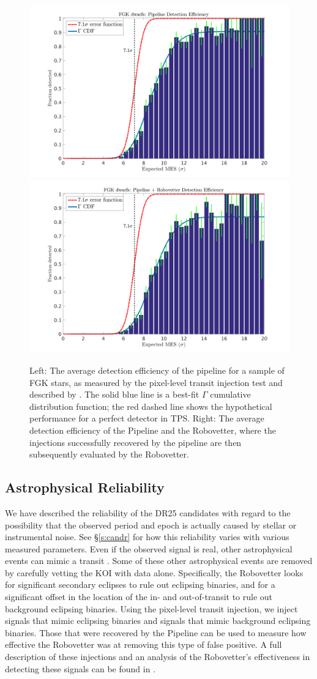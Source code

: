 \begin{figure}[ht]

\centering

\includegraphics[width=0.45\linewidth]{fig-senscurvwithfits_withoutRv.png}
\includegraphics[width=0.45\linewidth]{fig-senscurvwithfits_withRv.png}

\caption{Left: The average detection efficiency of the pipeline for a sample of FGK stars, as measured by the pixel-level transit injection test and described by \citet{Christiansen2017}. The solid blue line is a best-fit $\Gamma$ cumulative distribution function; the red dashed line shows the hypothetical performance for a perfect detector in TPS. Right: The average detection efficiency of the \Kepler{} Pipeline and the Robovetter, where the injections successfully recovered by the pipeline are then subsequently evaluated by the Robovetter.}

\label{f:fulldetectionefficiency}

\end{figure}


\subsection{Astrophysical Reliability}
We have described the reliability of the DR25 candidates with regard to the possibility that the observed period and epoch is actually caused by stellar or instrumental noise. See \S\ref{s:candr} for how this reliability varies with various measured parameters.  Even if the observed signal is real, other astrophysical events can mimic a transit \citep[see e.g.][]{Morton2016}. Some of these other astrophysical events are removed by carefully vetting the KOI with \Kepler{} data alone.  Specifically, the Robovetter looks for significant secondary eclipses to rule out eclipsing binaries, and for a significant offset in the location of the in- and out-of-transit to rule out background eclipsing binaries. Using the pixel-level transit injection, we inject signals that mimic eclipsing binaries and signals that mimic background eclipsing binaries. Those that were recovered by the \Kepler{} Pipeline can be used to measure how effective the Robovetter was at removing this type of false positive. A full description of these injections and an analysis of the Robovetter's effectiveness in detecting these signals can be found in \citet{Coughlin2017detmetrics}.

